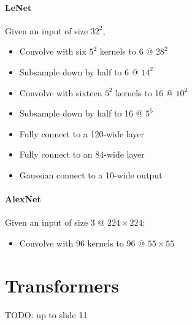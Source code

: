 \documentclass[class=cs480,notes,tikz]{agony}
\begin{document}
\paragraph{LeNet} Given an input of size $32^2$,
\begin{itemize}[nosep]
  \item Convolve with six $5^2$ kernels to 6 @ $28^2$
  \item Subsample down by half to 6 @ $14^2$
  \item Convolve with sixteen $5^2$ kernels to 16 @ $10^2$
  \item Subsample down by half to 16 @ $5^5$
  \item Fully connect to a 120-wide layer
  \item Fully connect to an 84-wide layer
  \item Gaussian connect to a 10-wide output
\end{itemize}

\paragraph{AlexNet} Given an input of size 3 @ $224 \times 224$:
\begin{itemize}[nosep]
  \item Convolve with 96 kernels to 96 @ $55 \times 55$
\end{itemize}

\section{Transformers}

TODO: up to slide 11
\end{document}
